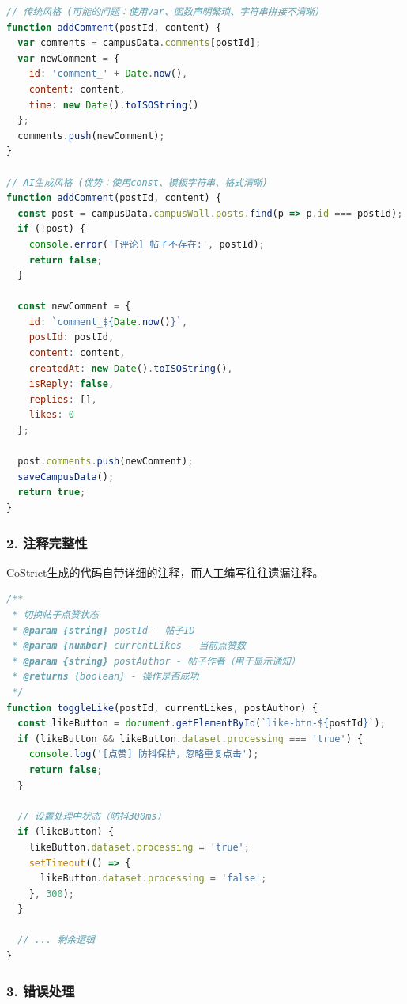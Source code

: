 ﻿\documentclass[12pt,a4paper]{article}
\begin{document}
\begin{lstlisting}[language=JavaScript, caption={传统风格 vs AI生成风格}]
// 传统风格 (可能的问题：使用var、函数声明繁琐、字符串拼接不清晰)
function addComment(postId, content) {
  var comments = campusData.comments[postId];
  var newComment = {
    id: 'comment_' + Date.now(),
    content: content,
    time: new Date().toISOString()
  };
  comments.push(newComment);
}

// AI生成风格 (优势：使用const、模板字符串、格式清晰)
function addComment(postId, content) {
  const post = campusData.campusWall.posts.find(p => p.id === postId);
  if (!post) {
    console.error('[评论] 帖子不存在:', postId);
    return false;
  }
  
  const newComment = {
    id: `comment_${Date.now()}`,
    postId: postId,
    content: content,
    createdAt: new Date().toISOString(),
    isReply: false,
    replies: [],
    likes: 0
  };
  
  post.comments.push(newComment);
  saveCampusData();
  return true;
}
\end{lstlisting}

\subsubsection{2. 注释完整性}

CoStrict生成的代码自带详细的注释，而人工编写往往遗漏注释。

\begin{lstlisting}[language=JavaScript, caption={AI生成代码的注释示例}]
/**
 * 切换帖子点赞状态
 * @param {string} postId - 帖子ID
 * @param {number} currentLikes - 当前点赞数
 * @param {string} postAuthor - 帖子作者（用于显示通知）
 * @returns {boolean} - 操作是否成功
 */
function toggleLike(postId, currentLikes, postAuthor) {
  const likeButton = document.getElementById(`like-btn-${postId}`);
  if (likeButton && likeButton.dataset.processing === 'true') {
    console.log('[点赞] 防抖保护，忽略重复点击');
    return false;
  }
  
  // 设置处理中状态（防抖300ms）
  if (likeButton) {
    likeButton.dataset.processing = 'true';
    setTimeout(() => {
      likeButton.dataset.processing = 'false';
    }, 300);
  }
  
  // ... 剩余逻辑
}
\end{lstlisting}

\subsubsection{3. 错误处理}
\end{document}
